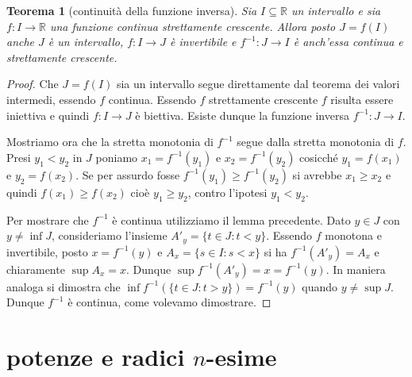 \documentclass[italian,a4paper,oneside,headinclude]{scrbook}
\renewcommand{\subset}{\subseteq}
\newcommand{\RR}{\mathbb R}
\newtheorem{theorem}{Teorema}
\begin{document}
\begin{theorem}[continuità della funzione inversa]
Sia $I\subset \RR$ un intervallo e sia $f\colon I \to \RR$ una
funzione continua strettamente crescente.
Allora posto $J=f(I)$ anche $J$ è un intervallo, $f\colon I\to J$ è
invertibile e $f^{-1}\colon J\to I$ è anch'essa
continua e strettamente crescente.
\end{theorem}
%
\begin{proof}
Che $J=f(I)$ sia un intervallo segue direttamente dal teorema dei valori intermedi, essendo $f$ continua. Essendo $f$ strettamente
crescente $f$ risulta essere iniettiva e quindi $f\colon I \to J$ è biettiva.
Esiste dunque la funzione inversa $f^{-1}\colon J \to I$.

Mostriamo ora che la stretta monotonia di $f^{-1}$ segue dalla stretta
monotonia di $f$. Presi $y_1 < y_2$ in $J$ poniamo $x_1=f^{-1}(y_1)$ e $x_2=f^{-1}(y_2)$ cosicché $y_1=f(x_1)$ e $y_2=f(x_2)$.
Se per assurdo fosse $f^{-1}(y_1)\ge f^{-1}(y_2)$ si avrebbe $x_1 \ge x_2$
e quindi $f(x_1)\ge f(x_2)$ cioè $y_1\ge y_2$, contro l'ipotesi $y_1 < y_2$.

Per mostrare che $f^{-1}$ è continua utilizziamo
il lemma precedente.
Dato $y \in J$ con $y\neq \inf J$, consideriamo l'insieme
$A'_y=\{t \in J\colon t<y\}$.
Essendo $f$ monotona e invertibile,
posto $x=f^{-1}(y)$ e $A_x=\{ s\in I\colon s<x\}$
si ha $f^{-1}(A'_y) = A_x$ e chiaramente $\sup A_x = x$.
Dunque $\sup f^{-1}(A'_y) = x = f^{-1}(y)$. In maniera analoga
si dimostra che $\inf f^{-1}(\{t\in J \colon t>y\}) = f^{-1}(y)$
quando $y\neq \sup J$. Dunque $f^{-1}$ è continua,
come volevamo dimostrare.
\end{proof}

\section{potenze e radici $n$-esime}
\end{document}
